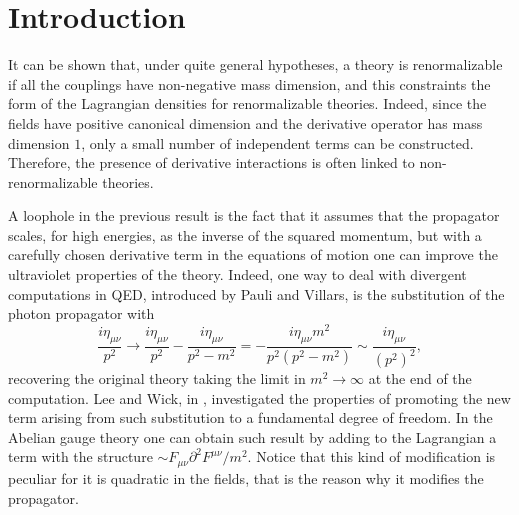
\chapter*{Introduction}

		\fancyhead{} %
			\fancyhead[LE]{\scshape \leftmark}
			\fancyhead[RO]{\scshape \rightmark}
	\fancyfoot[CE,CO]{\thepage}
	\fancyfoot[LO,RO]{ }
	\fancyfoot[LE,RE]{ }
		 		\renewcommand{\headrulewidth}{0.4pt}
			\renewcommand{\footrulewidth}{0.4pt}
		\pagestyle{fancy}
		\renewcommand{\sectionmark}[1]{\markright{\thesection.\ #1}}
		\renewcommand{\chaptermark}[1]{\markboth{\chaptername\ \thechapter.\ #1}{}}
	\fancyfoot[CE,CO]{\thepage}
	\fancyfoot[LO,RO]{ }
	\fancyfoot[LE,RE]{ }

It can be shown that, under quite general hypotheses, a theory is renormalizable if all the couplings have non-negative mass dimension, and this constraints the form of the Lagrangian densities for renormalizable theories. Indeed, since the fields have positive canonical dimension and the derivative operator has mass dimension $1$, only a small number of independent terms can be constructed. Therefore, the presence of derivative interactions is often linked to non-renormalizable theories. 



A loophole in the previous result is the fact that it assumes that the propagator scales, for high energies, as the inverse of the squared momentum, but with a carefully chosen derivative term in the equations of motion one can improve the ultraviolet properties of the theory. Indeed, one way to deal with divergent computations in QED, introduced by Pauli and Villars, is the substitution of the photon propagator with
\begin{equation*}%
 \frac{i \eta_{\mu\nu}}{p^2} \longrightarrow 
 \frac{i \eta_{\mu\nu}}{p^2}  -  \frac{i \eta_{\mu\nu}}{p^2 - m^2}
 =
- \frac{i \eta_{\mu\nu} m^2}{p^2(p^2-m^2)}
\sim \frac{i \eta_{\mu\nu}}{\left( p^2 \right)^2 },
\end{equation*}
recovering the original theory taking the limit in $m^2 \rightarrow \infty$ at the end of the computation. Lee and Wick, in \cite{Lee:1969fy,Lee:1970iw}, investigated the properties of promoting  the new term arising from such substitution to a fundamental degree of freedom. In the Abelian gauge theory one can obtain such result by adding to the Lagrangian a term with the structure
\(
\sim  F_{\mu\nu} \partial^2  F^{\mu\nu}/ m^2
\). Notice that this kind of modification is peculiar for it is quadratic in the fields, that is the reason why it modifies the propagator.




